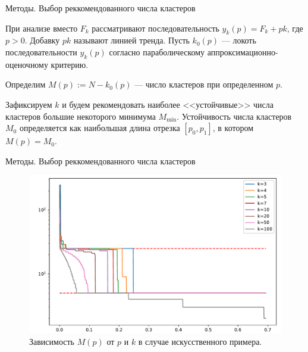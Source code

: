 \documentclass{beamer}
\begin{document}
\begin{frame}{Методы. Выбор реккомендованного числа кластеров}
  \vfill

  При анализе вместо $F_{k}$ рассматривают последовательность
  $y_{k}(p)=F_{k}+pk$, где $p>0$. Добавку $pk$ называют линией тренда. Пусть
  $k_0(p)$ --- локоть последовательности $y_{k}(p)$ согласно параболическому
  аппроксимационно-оценочному критерию.

  \vfill

  Определим $M(p):=N-k_0(p)$ --- число кластеров при определенном $p$.

  \vfill

  Зафиксируем $k$ и будем рекомендовать наиболее <<устойчивые>> числа кластеров
  большие некоторого минимума $M_{\min}$. Устойчивость числа кластеров $M_0$
  определяется как наибольшая длина отрезка $[p_0,p_1]$, в котором
  $M(p)=M_0$.

  \vfill
\end{frame}

\begin{frame}{Методы. Выбор реккомендованного числа кластеров}
  \begin{figure}
    \includegraphics[width=1.0\textwidth]{./figures/trend-analysis.pdf}

    \caption{Зависимость $M(p)$ от $p$ и $k$ в случае искусственного примера.}
  \end{figure}
\end{frame}
\end{document}
